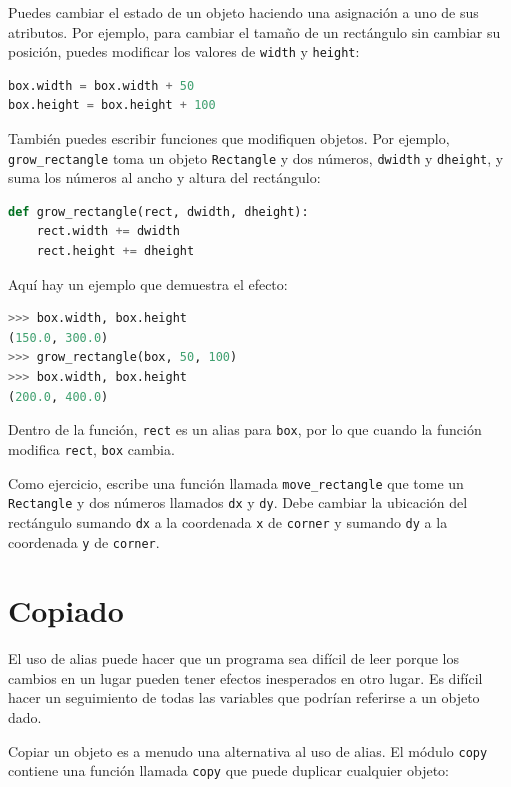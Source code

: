 Puedes cambiar el estado de un objeto haciendo una asignación a uno de sus atributos. Por ejemplo, para cambiar el tamaño de un rectángulo sin cambiar su posición, puedes modificar los valores de \texttt{width} y \texttt{height}:

\begin{lstlisting}[language=Python]
box.width = box.width + 50
box.height = box.height + 100
\end{lstlisting}

También puedes escribir funciones que modifiquen objetos. Por ejemplo, \texttt{grow\_rectangle} toma un objeto \texttt{Rectangle} y dos números, \texttt{dwidth} y \texttt{dheight}, y suma los números al ancho y altura del rectángulo:

\begin{lstlisting}[language=Python]
def grow_rectangle(rect, dwidth, dheight):
    rect.width += dwidth
    rect.height += dheight
\end{lstlisting}

Aquí hay un ejemplo que demuestra el efecto:

\begin{lstlisting}[language=Python]
>>> box.width, box.height
(150.0, 300.0)
>>> grow_rectangle(box, 50, 100)
>>> box.width, box.height
(200.0, 400.0)
\end{lstlisting}

Dentro de la función, \texttt{rect} es un alias para \texttt{box}, por lo que cuando la función modifica \texttt{rect}, \texttt{box} cambia.

Como ejercicio, escribe una función llamada \texttt{move\_rectangle} que tome un \texttt{Rectangle} y dos números llamados \texttt{dx} y \texttt{dy}. Debe cambiar la ubicación del rectángulo sumando \texttt{dx} a la coordenada \texttt{x} de \texttt{corner} y sumando \texttt{dy} a la coordenada \texttt{y} de \texttt{corner}.

\section{Copiado}

El uso de alias puede hacer que un programa sea difícil de leer porque los cambios en un lugar pueden tener efectos inesperados en otro lugar. Es difícil hacer un seguimiento de todas las variables que podrían referirse a un objeto dado.

Copiar un objeto es a menudo una alternativa al uso de alias. El módulo \texttt{copy} contiene una función llamada \texttt{copy} que puede duplicar cualquier objeto:


